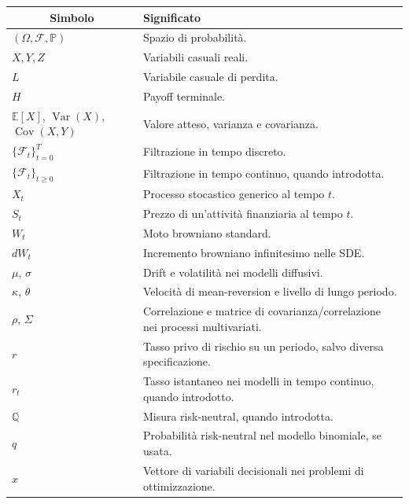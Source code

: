 \documentclass[12pt,a4paper]{article}%
\newcommand{\1}{\mathbf{1}}
\begin{document}
\begin{center}%
\begin{tabular}
[c]{cp{8.5cm}}\hline
\textbf{Simbolo} & \textbf{Significato}\\\hline
\multicolumn{1}{l}{$(\Omega,\mathcal{F},\mathbb{P})$} & Spazio di
probabilit\`{a}.\\
\multicolumn{1}{l}{$X,Y,Z$} & Variabili casuali reali.\\
\multicolumn{1}{l}{$L$} & Variabile casuale di perdita.\\
\multicolumn{1}{l}{$H$} & Payoff terminale.\\
\multicolumn{1}{l}{$\mathbb{E}[X]$, $\operatorname{Var}(X)$,
$\operatorname{Cov}(X,Y)$} & Valore atteso, varianza e covarianza.\\
\multicolumn{1}{l}{$\{\mathcal{F}_{t}\}_{t=0}^{T}$} & Filtrazione in tempo
discreto.\\
\multicolumn{1}{l}{$\{\mathcal{F}_{t}\}_{t\geq0}$} & Filtrazione in tempo
continuo, quando introdotta.\\
\multicolumn{1}{l}{$X_{t}$} & Processo stocastico generico al tempo $t$.\\
\multicolumn{1}{l}{$S_{t}$} & Prezzo di un'attivit\`{a} finanziaria al tempo
$t$.\\
\multicolumn{1}{l}{$W_{t}$} & Moto browniano standard.\\
\multicolumn{1}{l}{$dW_{t}$} & Incremento browniano infinitesimo nelle SDE.\\
\multicolumn{1}{l}{$\mu$, $\sigma$} & Drift e volatilit\`{a} nei modelli
diffusivi.\\
\multicolumn{1}{l}{$\kappa$, $\theta$} & Velocit\`{a} di mean-reversion e
livello di lungo periodo.\\
\multicolumn{1}{l}{$\rho$, $\Sigma$} & Correlazione e matrice di
covarianza/correlazione nei processi multivariati.\\
\multicolumn{1}{l}{$r$} & Tasso privo di rischio su un periodo, salvo diversa
specificazione.\\
\multicolumn{1}{l}{$r_{t}$} & Tasso istantaneo nei modelli in tempo continuo,
quando introdotto.\\
\multicolumn{1}{l}{$\mathbb{Q}$} & Misura risk-neutral, quando introdotta.\\
\multicolumn{1}{l}{$q$} & Probabilit\`{a} risk-neutral nel modello binomiale,
se usata.\\
\multicolumn{1}{l}{$x$} & Vettore di variabili decisionali nei problemi di
ottimizzazione.\\

\end{tabular}
\end{center}
\end{document}
